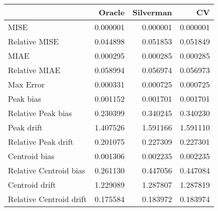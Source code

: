 \begin{tabular}{lrrr}
  \hline
 & Oracle & Silverman & CV \\ 
  \hline
MISE & 0.000001 & 0.000001 & 0.000001 \\ 
  Relative MISE & 0.044898 & 0.051853 & 0.051849 \\ 
  MIAE & 0.000295 & 0.000285 & 0.000285 \\ 
  Relative MIAE & 0.058994 & 0.056974 & 0.056973 \\ 
  Max Error & 0.000331 & 0.000725 & 0.000725 \\ 
  Peak bias & 0.001152 & 0.001701 & 0.001701 \\ 
  Relative Peak bias & 0.230399 & 0.340245 & 0.340230 \\ 
  Peak drift & 1.407526 & 1.591166 & 1.591110 \\ 
  Relative Peak drift & 0.201075 & 0.227309 & 0.227301 \\ 
  Centroid bias & 0.001306 & 0.002235 & 0.002235 \\ 
  Relative Centroid bias & 0.261130 & 0.447056 & 0.447084 \\ 
  Centroid drift & 1.229089 & 1.287807 & 1.287819 \\ 
  Relative Centroid drift & 0.175584 & 0.183972 & 0.183974 \\ 
   \hline
\end{tabular}
